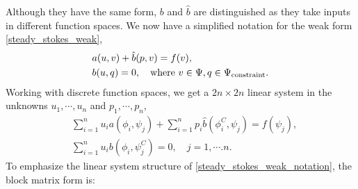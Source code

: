 \documentclass[11pt,a4paper]{memoir}
\begin{document}
Although they have the same form, $b$ and $\hat{b}$ are distinguished as they take inputs in different function spaces.
We now have a simplified notation for the weak form \eqref{steady_stokes_weak},
\begin{equation}\label{steady_stokes_weak_notation}
\begin{split}
    &a(u, v) + \hat{b}(p, v) = f(v),\\
    &b(u, q) = 0, \quad\text{where $v \in \Psi, q \in {\Psi_{\text{constraint}}}$}.
\end{split}
\end{equation}
Working with discrete function spaces, we get a $2n\times 2n$ linear system in the unknowns $u_1,\cdots,u_n$ and $p_1,\cdots,p_n$,
\begin{equation}\label{steady_stokes_weak_notation}
\begin{split}
    &\sum_{i=1}^n u_i a\left(\phi_i, \psi_j\right) + \sum_{i=1}^np_i\hat{b}\left(\phi^C_i, \psi_j\right) = f(\psi_j),\\
    &\sum_{i=1}^nu_ib\left(\phi_i, \psi^C_j\right) = 0,\quad j=1,\cdots.n.
\end{split}
\end{equation}
To emphasize the linear system structure of \eqref{steady_stokes_weak_notation}, the block matrix form is:
\end{document}
